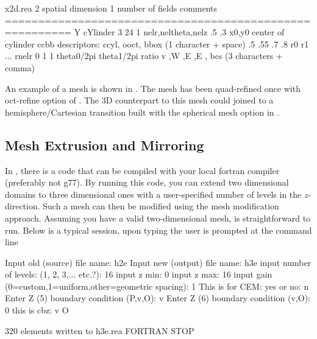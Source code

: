 \documentclass[letterpaper,10pt,english]{sphinxmanual}
\begin{document}
%
\begin{sphinxVerbatim}[commandchars=\\\{\}]
x2d.rea
2                      spatial dimension
1                      number of fields
\PYGZsh{}
\PYGZsh{}    comments
\PYGZsh{}
\PYGZsh{}
\PYGZsh{}========================================================
\PYGZsh{}
Y                   cYlinder
3 \PYGZhy{}24 1             nelr,nel\PYGZus{}theta,nelz
.5 .3               x0,y0 \PYGZhy{} center of cylinder
ccbb                descriptors: c\PYGZhy{}cyl, o\PYGZhy{}oct, b\PYGZhy{}box (1 character + space)
.5 .55 .7 .8        r0 r1 ... r\PYGZus{}nelr
0  1  1             theta0/2pi theta1/2pi  ratio
v  ,W  ,E  ,E  ,    bc\PYGZsq{}s (3 characters + comma)
\end{sphinxVerbatim}

An example of a mesh is shown in .   The mesh has been quad-refined
once with oct-refine option of . The 3D counterpart to this
mesh could joined to a hemisphere/Cartesian transition built with
the spherical mesh option in .


\subsection{Mesh Extrusion and Mirroring}
\label{\detokenize{appendix:mesh-extrusion-and-mirroring}}
In , there is a code  that can be compiled with your
local fortran compiler (preferably not g77).
By running this code, you can extend two dimensional domains to
three dimensional ones with a user-specified number of levels in the
\(z\)-direction.  Such a mesh can then be modified using the mesh modification
approach. Assuming you have a valid two-dimensional mesh,  is straightforward
to run.  Below is a typical session, upon typing  the user is prompted at the command line

%
\begin{sphinxVerbatim}[commandchars=\\\{\}]
 Input old (source) file name:
h2e
 Input new (output) file name:
h3e
 input number of levels: (1, 2, 3,... etc.?):
16
 input z min:
0
 input z max:
16
 input gain (0=custom,1=uniform,other=geometric spacing):
1
 This is for CEM: yes or no:
n
 Enter Z (5) boundary condition (P,v,O):
v
 Enter Z (6) boundary condition (v,O):
0
 this is cbz: v  O   \PYGZlt{}\PYGZhy{}\PYGZhy{}\PYGZhy{}

      320 elements written to h3e.rea
FORTRAN STOP
\end{sphinxVerbatim}
\end{document}
